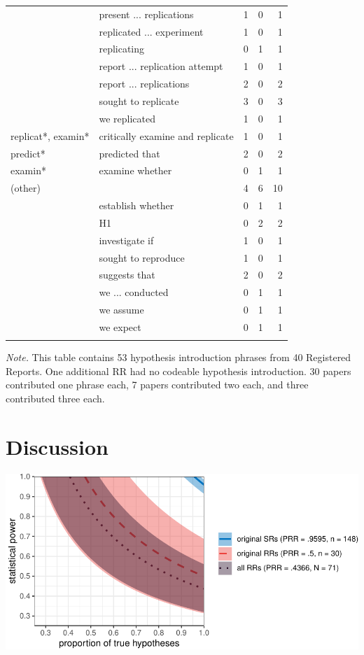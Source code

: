 \documentclass[british,,man,floatsintext]{apa6}
\begin{document}
\begin{table}[tbp]
\begin{center}
\begin{threeparttable}
{\begin{tabular}{llrrr}
 & present ... replications & 1 & 0 & 1\\
 & replicated ... experiment & 1 & 0 & 1\\
 & replicating & 0 & 1 & 1\\
 & report ... replication attempt & 1 & 0 & 1\\
 & report ... replications & 2 & 0 & 2\\
 & sought to replicate & 3 & 0 & 3\\
 & we replicated & 1 & 0 & 1\\ \midrule
replicat*, examin* & critically examine and replicate & 1 & 0 & 1\\ \midrule
predict* & predicted that & 2 & 0 & 2\\ \midrule
examin* & examine whether & 0 & 1 & 1\\ \midrule
(other) &  & 4 & 6 & 10\\
 & establish whether & 0 & 1 & 1\\
 & H1 & 0 & 2 & 2\\
 & investigate if & 1 & 0 & 1\\
 & sought to reproduce & 1 & 0 & 1\\
 & suggests that & 2 & 0 & 2\\
 & we ... conducted & 0 & 1 & 1\\
 & we assume & 0 & 1 & 1\\
 & we expect & 0 & 1 & 1\\
\bottomrule
\addlinespace
\end{tabular}
}
\begin{tablenotes}[para]
\normalsize{\textit{Note.} This table contains 53 hypothesis introduction phrases from 40 Registered Reports. One additional RR had no codeable hypothesis introduction. 30 papers contributed one phrase each, 7 papers contributed two each, and three contributed three each.}
\end{tablenotes}
\end{threeparttable}
\end{center}
\end{table}

\hypertarget{discussion}{%
\section{Discussion}\label{discussion}}

\includegraphics{manuscript_files/figure-latex/unnamed-chunk-11-1.pdf}
\end{document}
